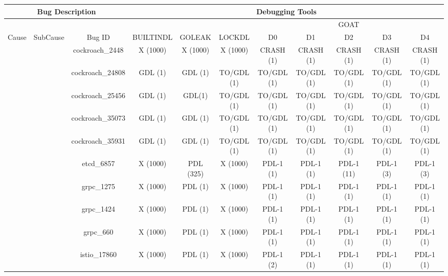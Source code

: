 \begin{tabular}{|c|c|c|ccc|ccccc|}
\hline
\multicolumn{3}{|c|}{Bug Description} & \multicolumn{8}{c|}{Debugging Tools} \\ \hline
 &  &  & \multicolumn{1}{c|}{} & \multicolumn{1}{c|}{} &  & \multicolumn{5}{c|}{GOAT} \\ \cline{7-11}
\multirow{-2}{*}{Cause} & \multirow{-2}{*}{SubCause} & \multirow{-2}{*}{Bug ID} & \multicolumn{1}{c|}{\multirow{-2}{*}{BUILTINDL}} & \multicolumn{1}{c|}{\multirow{-2}{*}{GOLEAK}} & \multirow{-2}{*}{LOCKDL} & \multicolumn{1}{c|}{D0} & \multicolumn{1}{c|}{D1} & \multicolumn{1}{c|}{D2} & \multicolumn{1}{c|}{D3} & D4 \\ \hline
 &  & cockroach\_2448 & X (1000) & X (1000) & X (1000) & CRASH (1) & CRASH (1) & CRASH (1) & CRASH (1) & CRASH (1) \\ \cline{3-3}
 &  & cockroach\_24808 & GDL (1) & GDL (1) & TO/GDL (1) & TO/GDL (1) & TO/GDL (1) & TO/GDL (1) & TO/GDL (1) & TO/GDL (1) \\ \cline{3-3}
 &  & cockroach\_25456 & GDL (1) & GDL(1) & TO/GDL (1) & TO/GDL (1) & TO/GDL (1) & TO/GDL (1) & TO/GDL (1) & TO/GDL (1) \\ \cline{3-3}
 &  & cockroach\_35073 & GDL (1) & GDL (1) & TO/GDL (1) & TO/GDL (1) & TO/GDL (1) & TO/GDL (1) & TO/GDL (1) & TO/GDL (1) \\ \cline{3-3}
 &  & cockroach\_35931 & GDL (1) & GDL (1) & TO/GDL (1) & TO/GDL (1) & TO/GDL (1) & TO/GDL (1) & TO/GDL (1) & TO/GDL (1) \\ \cline{3-3}
 &  & etcd\_6857 & X (1000) & PDL (325) & X (1000) & \cellcolor[HTML]{EFEFEF}PDL-1 (1) & \cellcolor[HTML]{EFEFEF}PDL-1 (1) & \cellcolor[HTML]{EFEFEF}PDL-1 (11) & \cellcolor[HTML]{EFEFEF}PDL-1 (3) & \cellcolor[HTML]{EFEFEF}PDL-1 (3) \\ \cline{3-3}
 &  & grpc\_1275 & X (1000) & PDL (1) & X (1000) & PDL-1 (1) & PDL-1 (1) & PDL-1 (1) & PDL-1 (1) & PDL-1 (1) \\ \cline{3-3}
 &  & grpc\_1424 & X (1000) & PDL (1) & X (1000) & PDL-1 (1) & PDL-1 (1) & PDL-1 (1) & PDL-1 (1) & PDL-1 (1) \\ \cline{3-3}
 &  & grpc\_660 & X (1000) & PDL (1) & X (1000) & PDL-1 (1) & PDL-1 (1) & PDL-1 (1) & PDL-1 (1) & PDL-1 (1) \\ \cline{3-3}
 &  & istio\_17860 & X (1000) & PDL (1) & X (1000) & PDL-1 (2) & PDL-1 (1) & PDL-1 (1) & PDL-1 (1) & PDL-1 (1) \\ \cline{3-3}

\end{tabular}
